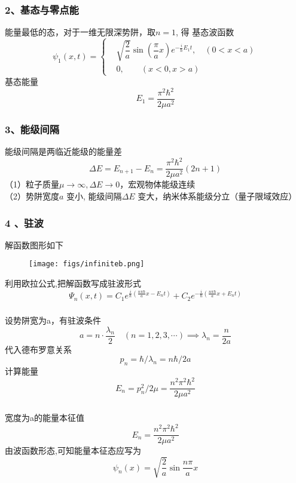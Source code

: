 \begin{frame}
  \frametitle{ 2、基态与零点能}
\emf[基态：] 能量最低的态，对于一维无限深势阱，取$n=1$, 得
基态波函数
\[ \psi _1 (x,t)=\left\{
\begin{aligned}
    & \sqrt{\dfrac{2}{a}}\sin(\dfrac{\pi}{a}x) e^{-\frac{i}{\hbar}E_1 t}, \quad (0 < x < a) \\ 
    & 0, \quad \quad ( x < 0, x > a)
\end{aligned} \right.
\]
基态能量
\[E_1 = \dfrac{\pi^2\hbar^2}{2\mu a^2} \]
\end{frame} 

\begin{frame}
  \frametitle{ 3、能级间隔}
  能级间隔是两临近能级的能量差
  \[\Delta E = E_{n+1} - E_n = \dfrac{\pi^2\hbar^2}{2\mu a^2} (2n+1)\]
  （1）粒子质量$\mu \to \infty, \Delta E \to 0$，宏观物体能级连续 \\
  （2）势阱宽度$ a$ 变小, 能级间隔$\Delta E$ 变大，纳米体系能级分立（量子限域效应）
\end{frame} 

\begin{frame}
  \frametitle{ 4 、驻波}
  解函数图形如下
\begin{figure}[htbp]
    \centering
    \texttt{[image: figs/infiniteb.png]}
\end{figure}
利用欧拉公式,把解函数写成驻波形式$$
\Psi_n(x, t)=C_1 e^{\frac{i}{\hbar}\left(\frac{n \pi \hbar}{a} x-E_n t\right)}+C_2 e^{-\frac{i}{\hbar}\left(\frac{n \pi \hbar}{a} x+E_n t\right)}
$$
\end{frame} 

\begin{frame}
  \frametitle{}
\解 设势阱宽为a，有驻波条件
$$
a=n \cdot \frac{\lambda _n}{2} \quad(n=1,2,3, \cdots) \implies \lambda _n = \frac{n}{2a} 
$$
代入德布罗意关系
$$
p_n=\hbar / \lambda _n =n \hbar / 2 a
$$
计算能量
$$
E_n=p_n^2 / 2 \mu=\frac{n^2 \pi^2 \hbar^2}{2 \mu a^2}
$$
\end{frame} 

\begin{frame}
  \frametitle{}
\解 宽度为a的能量本征值
\[E_n = \dfrac{n^2\pi^2\hbar^2}{2\mu a^2} \]
由波函数形态,可知能量本征态应写为
$$
\psi_n(x)=\sqrt{\frac{2}{a}} \sin \frac{n \pi}{a} x
$$
\end{frame} 


